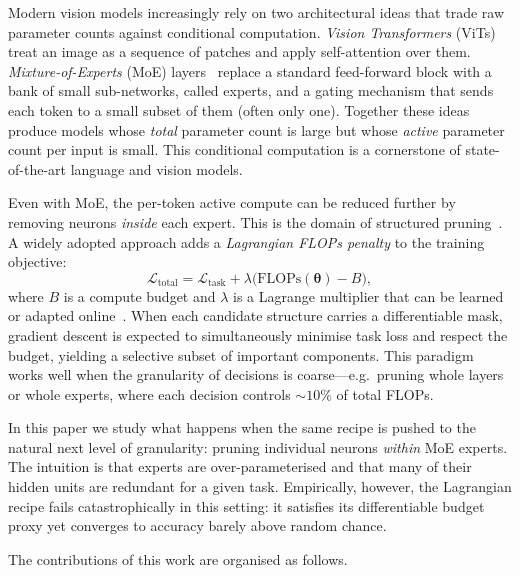 \documentclass[fleqn,10pt]{article}
\newcommand{\btheta}{\boldsymbol{\theta}}
\begin{document}
Modern vision models increasingly rely on two architectural ideas that
trade raw parameter counts against conditional computation.
\emph{Vision Transformers} (ViTs)~\citep{dosovitskiy2021image} treat an
image as a sequence of patches and apply self-attention over them.
\emph{Mixture-of-Experts} (MoE) layers~\citep{shazeer2017outrageously,
fedus2022switch,riquelme2021scaling} replace a standard
feed-forward block with a bank of small sub-networks, called experts,
and a gating mechanism that sends each token to a small subset of
them (often only one). Together these ideas produce models whose
\emph{total} parameter count is large but whose \emph{active}
parameter count per input is small. This conditional computation is a
cornerstone of state-of-the-art language and vision models.

Even with MoE, the per-token active compute can be reduced further by
removing neurons \emph{inside} each expert. This is the domain of
structured pruning~\citep{han2015learning,li2017pruning,
liu2017learning,molchanov2017variational,chen2021chasing,yu2022width}. A widely adopted approach adds a
\emph{Lagrangian FLOPs penalty} to the training objective:
\begin{equation}
\label{eq:lagrangian}
\mathcal{L}_{\text{total}}
  = \mathcal{L}_{\text{task}}
    + \lambda\bigl(\mathrm{FLOPs}(\btheta) - B\bigr),
\end{equation}
where $B$ is a compute budget and $\lambda$ is a Lagrange multiplier
that can be learned or adapted online~\citep{gordon2018morphnet,
lemaire2019structured}. When each candidate structure carries a
differentiable mask, gradient descent is expected to simultaneously
minimise task loss and respect the budget, yielding a selective subset
of important components. This paradigm works well when the
granularity of decisions is coarse---e.g.\ pruning whole layers or
whole experts, where each decision controls $\sim\!10\%$ of total
FLOPs.

In this paper we study what happens when the same recipe is pushed to
the natural next level of granularity: pruning individual neurons
\emph{within} MoE experts. The intuition is that experts are
over-parameterised and that many of their hidden units are redundant
for a given task. Empirically, however, the Lagrangian recipe fails
catastrophically in this setting: it satisfies its differentiable
budget proxy yet converges to accuracy barely above random chance.

The contributions of this work are organised as follows.
\end{document}
